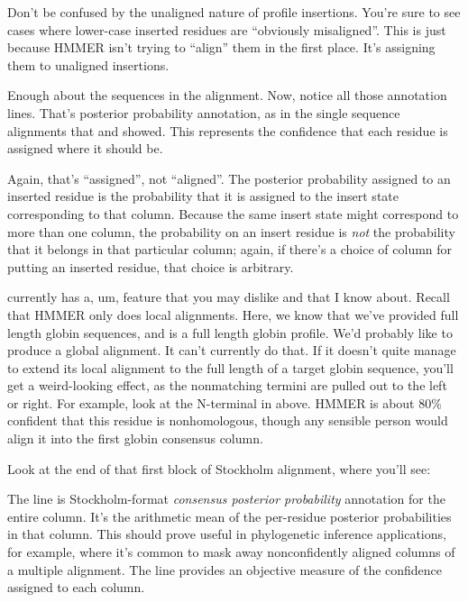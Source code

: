 Don't be confused by the unaligned nature of profile 
insertions. You're sure to see cases where lower-case inserted
residues are ``obviously misaligned''.  This is just because HMMER
isn't trying to ``align'' them in the first place. It's assigning
them to unaligned insertions.

Enough about the sequences in the alignment. Now, notice all those
 annotation lines. That's posterior probability annotation,
as in the single sequence alignments that  and
 showed. This represents the confidence that each
residue is assigned where it should be.

Again, that's ``assigned'', not ``aligned''. The posterior probability
assigned to an inserted residue is the probability that it is assigned
to the insert state corresponding to that column. Because the same
insert state might correspond to more than one column, the probability
on an insert residue is \emph{not} the probability that it belongs in
that particular column; again, if there's a choice of column for
putting an inserted residue, that choice is arbitrary.

 currently has a, um, feature that you may dislike and
that I know about. Recall that HMMER only does local
alignments. Here, we know that we've provided full length globin
sequences, and  is a full length globin profile. We'd
probably like  to produce a global alignment. It can't
currently do that. If it doesn't quite manage to extend its local
alignment to the full length of a target globin sequence, you'll get a
weird-looking effect, as the nonmatching termini are pulled out to the
left or right. For example, look at the N-terminal  in
 above. HMMER is about 80\% confident that this
residue is nonhomologous, though any sensible person would align it
into the first globin consensus column.

Look at the end of that first block of Stockholm alignment, where you'll
see:


The  line is Stockholm-format \emph{consensus
  posterior probability} annotation for the entire column. It's the
arithmetic mean of the per-residue posterior probabilities in that
column. This should prove useful in phylogenetic inference
applications, for example, where it's common to mask away
nonconfidently aligned columns of a multiple alignment. The
 line provides an objective measure of the confidence
assigned to each column.

